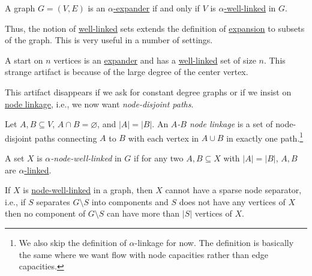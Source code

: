 \begin{corollary}
	A graph \(G = (V, E)\) is an \hyperref[def:expander]{\(\alpha \)-expander} if and only if \(V\) is \hyperref[def:fractional-well-linked]{\(\alpha \)-well-linked} in \(G\).
\end{corollary}

Thus, the notion of \hyperref[def:fractional-well-linked]{well-linked} sets extends the definition of \hyperref[def:expansion]{expansion} to subsets of the graph. This is very useful in a number of settings.

\begin{eg}[Star]
	A start on \(n\) vertices is an \hyperref[def:expander]{expander} and has a \hyperref[def:well-linked]{well-linked} set of size \(n\). This strange artifact is because of the large degree of the center vertex.
\end{eg}

This artifact disappears if we ask for constant degree graphs or if we insist on \hyperref[def:node-linkage]{node linkage}, i.e., we now want \emph{node-disjoint paths}.

\begin{definition}\label{def:node-linkage}
	Let \(A, B \subseteq V\), \(A \cap B = \varnothing \), and \(\lvert A \rvert = \lvert B \rvert \). An \emph{\(A\)-\(B\) node linkage} is a set of node-disjoint paths connecting \(A\) to \(B\) with each vertex in \(A \cup B\) in exactly one path.\footnote{We also skip the definition of \(\alpha \)-linkage for now. The definition is basically the same where we want flow with node capacities rather than edge capacities.}
\end{definition}

\begin{definition}\label{def:node-well-linked}
	A set \(X\) is \emph{\(\alpha \)-node-well-linked} in \(G\) if for any two \(A, B \subseteq X\) with \(\lvert A \rvert = \lvert B \rvert \), \(A, B\) are \hyperref[def:node-linkage]{\(\alpha \)-linked}.
\end{definition}

\begin{intuition}
	If \(X\) is \hyperref[def:node-well-linked]{node-well-linked} in a graph, then \(X\) cannot have a sparse node separator, i.e., if \(S\) separates \(G\setminus S\)  	into components and \(S\) does not have any vertices of \(X\) then no component of \(G\setminus S\) can have more than \(\lvert S \rvert \) vertices of \(X\).
\end{intuition}

